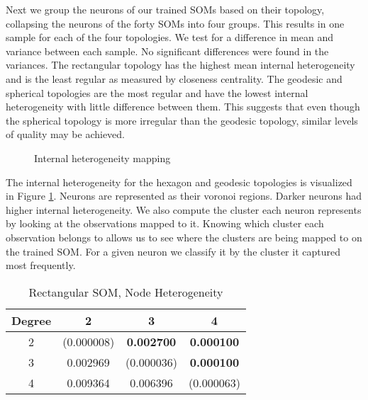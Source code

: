 Next we group the neurons of our trained SOMs based on their topology,
collapsing the neurons of the forty SOMs into four groups.  This results in one
sample for each of the four topologies.  We test for a difference in mean and
variance between each sample. No significant differences were found in the
variances.  The rectangular topology has the highest mean internal heterogeneity
and is the least regular as measured by closeness centrality. The geodesic and
spherical topologies are the most regular and have the lowest internal
heterogeneity with little difference between them.  This suggests that even
though the spherical topology is more irregular than the geodesic topology,
similar levels of quality may be achieved. 

\begin{figure}[ht]
\centering
\caption{Internal heterogeneity mapping}
\label{cluster}
\end{figure}

The internal heterogeneity for the hexagon and geodesic topologies is visualized
in Figure \ref{cluster}.  Neurons are represented as their voronoi regions.
Darker neurons had higher internal heterogeneity.  We also compute the cluster
each neuron represents by looking at the observations mapped to it.  Knowing
which cluster each observation belongs to allows us to see where the clusters
are being mapped to on the trained SOM. For a given neuron we classify it by
the cluster it captured most frequently.
\begin{table}[htb]
\centering
\scriptsize
\caption{Rectangular SOM, Node Heterogeneity}
\label{rectHet}
   \begin{tabular}{|c||c|c|c|}
    \hline
    Degree&2&3&4\\\hline
    \hline
    2 & (0.000008) & \textbf{0.002700} & \textbf{0.000100}\\\hline
    3 & 0.002969 & (0.000036) & \textbf{0.000100}\\\hline
    4 & 0.009364 & 0.006396 & (0.000063)\\\hline
    \end{tabular}
\end{table}

